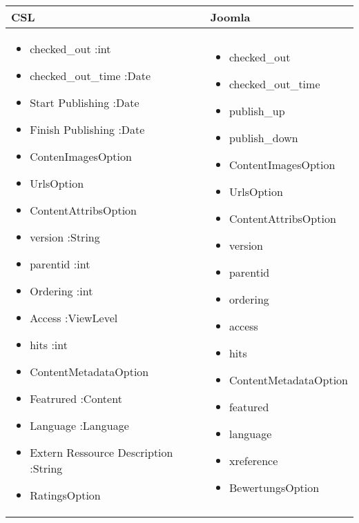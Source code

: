 \begin{minipage}{0.7\textwidth}
\begin{tabular}{|p{} | p{}|}
\hline
\textbf{CSL} & \textbf{Joomla} \\ 
\hline
 \begin{itemize}
 \item checked\_out :int
  \item checked\_out\_time  :Date
 \item Start Publishing :Date
 \item Finish Publishing :Date
 \item ContenImagesOption
\item UrlsOption
\item ContentAttribsOption
\item version :String
 \item parentid :int
\item Ordering :int
\item Access :ViewLevel
\item hits :int
\item ContentMetadataOption
\item Featrured :Content
\item Language :Language
\item Extern Ressource Description :String
\item RatingsOption
 \end{itemize}
 & 
\begin{itemize}
\item checked\_out 
  \item checked\_out\_time 
  \item publish\_up 
  \item publish\_down 
  \item ContentImagesOption
 \item UrlsOption
 \item ContentAttribsOption
 \item version 
 \item parentid 
 \item ordering 
 \item access 
 \item hits 
 \item ContentMetadataOption 
 \item featured 
 \item language 
 \item xreference
 \item BewertungsOption
\end{itemize}
\\
\hline
\end{tabular}
\end{minipage}

